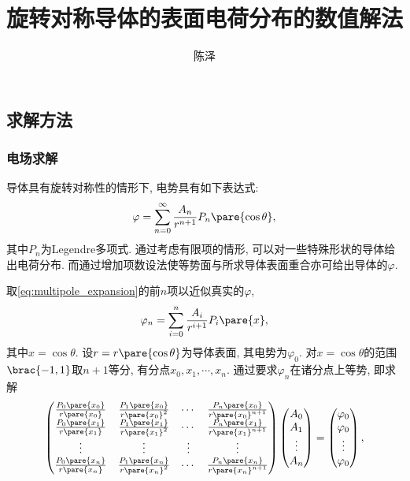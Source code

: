\documentclass[hidelinks]{ctexart}
\title{旋转对称导体的表面电荷分布的数值解法}
\author{陈泽}
\date{}
\let\oldcite\cite
\def\cite#1{\textsuperscript{\oldcite{#1}}}
\begin{document}
    
\maketitle

\subsection*{求解方法} %
\label{sub:求解方法}

\subsubsection*{电场求解} %
\label{ssub:电场求解}

导体具有旋转对称性的情形下, 电势具有如下表达式\cite{jackson_classical_1999}:
\begin{equation}
    \label{eq:multipole_expansion}
    \varphi = \sum_{n=0}^\infty \frac{A_n}{r^{n+1}}P_n\pare{\cos\theta}, 
\end{equation}
其中$P_n$为Legendre多项式. 通过考虑有限项的情形, 可以对一些特殊形状的导体给出电荷分布\cite{Polyakov}.
而通过增加项数设法使等势面与所求导体表面重合亦可给出导体的$\varphi$.
\par
取\eqref{eq:multipole_expansion}的前$n$项以近似真实的$\varphi$,
\begin{equation}
\label{eq:phi_approx}
    \varphi_n = \sum_{i=0}^n \frac{A_i}{r^{i+1}}P_i\pare{x},
\end{equation}
其中$x=\cos\theta$. 设$r=r\pare{\cos\theta}$为导体表面, 其电势为$\varphi_0$. 对$x=\cos\theta$的范围$\brac{-1,1}$取$n+1$等分, 有分点$x_0, x_1,\cdots, x_n$. 通过要求$\varphi_n$在诸分点上等势, 即求解
\begin{equation}
\label{eq:brutal_interpolation}
    \begin{pmatrix}
        \frac{P_0\pare{x_0}}{r\pare{x_0}} & \frac{P_1\pare{x_0}}{r\pare{x_0}^2} & \cdots & \frac{P_n\pare{x_0}}{r\pare{x_0}^{n+1}}\\
        \frac{P_0\pare{x_1}}{r\pare{x_1}} & \frac{P_1\pare{x_1}}{r\pare{x_1}^2} & \cdots & \frac{P_n\pare{x_1}}{r\pare{x_1}^{n+1}}\\
        \vdots & \vdots & \vdots & \vdots \\
        \frac{P_0\pare{x_n}}{r\pare{x_n}} & \frac{P_1\pare{x_n}}{r\pare{x_n}^2} & \cdots & \frac{P_n\pare{x_n}}{r\pare{x_n}^{n+1}}\\
    \end{pmatrix}\begin{pmatrix}
        A_0\\
        A_1\\
        \vdots\\
        A_n
    \end{pmatrix} = \begin{pmatrix}
        \varphi_0 \\
        \varphi_0 \\
        \vdots\\
        \varphi_0
    \end{pmatrix},
\end{equation} 
\end{document}
